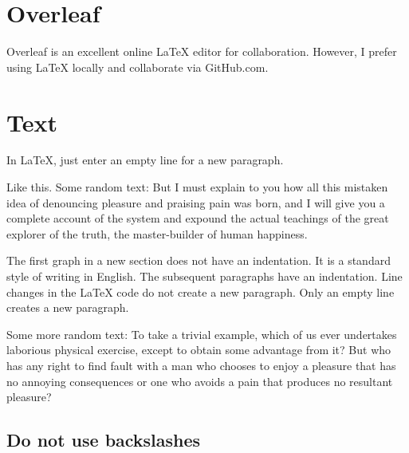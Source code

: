 \documentclass[letterpaper, 11pt]{article}
\newenvironment{textexample}
 {\VerbatimOut{\jobname.tmp}}
 {\endVerbatimOut
  \lstset{basicstyle=\linespread{1.0}\ttfamily\footnotesize}
  \begin{framed}\end{framed}
  
 \begin{framed}\noindent\end{framed}
}
\begin{document}
\section{Overleaf}
Overleaf is an excellent online LaTeX editor for collaboration.
However, I prefer using LaTeX locally and collaborate via GitHub.com. 







\section{Text} \label{sec:paragraph}

\begin{textexample}
In LaTeX, just enter an empty line for a new paragraph. 

Like this. Some random text: But I must explain to you how all this mistaken idea of denouncing pleasure and praising pain was born, and I will give you a complete account of the system and expound the actual teachings of the great explorer of the truth, the master-builder of human happiness.

The first graph in a new section does not have an indentation. 
It is a standard style of writing in English.
The subsequent paragraphs have an indentation.
Line changes in the LaTeX code do not create a new paragraph.
Only an empty line creates a new paragraph.

Some more random text: 
To take a trivial example, 
which of us ever undertakes laborious physical exercise, 
except to obtain some advantage from it? 
But who has any right to find fault with a man who chooses to enjoy a pleasure that has no annoying consequences 
or one who avoids a pain that produces no resultant pleasure?

\end{textexample}

\newpage

\subsection{Do not use backslashes}
\end{document}
